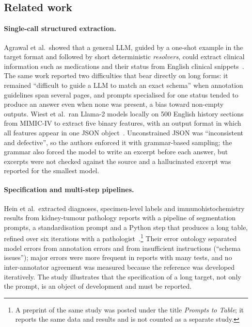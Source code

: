 \subsection{Related work}\label{sec:related}

\paragraph{Single-call structured extraction.} Agrawal et al.\ showed that a general LLM, guided by a one-shot
example in the target format and followed by short deterministic \emph{resolvers}, could extract clinical
information such as medications and their status from English clinical snippets~\cite{agrawal2022fewshot}.
The same work reported two difficulties that bear directly on long forms: it remained ``difficult to guide a
LLM to match an exact schema'' when annotation guidelines span several pages, and prompts specialised for one
status tended to produce an answer even when none was present, a bias toward non-empty outputs. Wiest et al.\
ran Llama-2 models locally on 500 English history sections from MIMIC-IV to extract five binary features,
with an output format in which all features appear in one JSON object~\cite{privacy2024structured}. Unconstrained JSON was ``inconsistent and
defective'', so the authors enforced it with grammar-based sampling; the grammar also forced the model to
write an excerpt before each answer, but excerpts were not checked against the source and a hallucinated
excerpt was reported for the smallest model.

\paragraph{Specification and multi-step pipelines.} Hein et al.\ extracted diagnoses, specimen-level labels and
immunohistochemistry results from kidney-tumour pathology reports with a pipeline of segmentation prompts,
a standardisation prompt and a Python step that produces a long table, refined over six iterations with a
pathologist~\cite{iterativerefine2025}.\footnote{A preprint of the same study was posted under the title
\emph{Prompts to Table}; it reports the same data and results and is not counted as a separate study.} Their
error ontology separated model errors from annotation errors and from insufficient instructions (``schema
issues''); major errors were more frequent in reports with many tests, and no inter-annotator agreement was
measured because the reference was developed iteratively. The study illustrates that the specification of a
long target, not only the prompt, is an object of development and must be reported.

